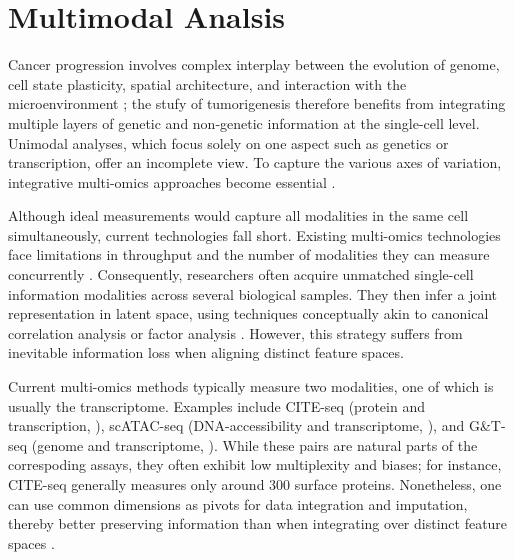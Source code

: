 \section{Multimodal Analsis}

\label{sec:modalities-multimodal-intro}

Cancer progression involves complex interplay between the evolution of genome, cell state plasticity, spatial architecture, and interaction with the microenvironment ; the stufy of tumorigenesis therefore benefits from integrating multiple layers of genetic and non-genetic information at the single-cell level. Unimodal analyses, which focus solely on one aspect such as genetics or transcription, offer an incomplete view. To capture the various axes of variation, integrative multi-omics approaches become essential \parencite{Nam2021-xt,Baysoy2023-qr}.

Although ideal measurements would capture all modalities in the same cell simultaneously, current technologies fall short. Existing multi-omics technologies face limitations in throughput and the number of modalities they can measure concurrently \parencite{Baysoy2023-qr}. Consequently, researchers often acquire unmatched single-cell information modalities across several biological samples. They then infer a joint representation in latent space, using techniques conceptually akin to canonical correlation analysis \parencite{Stuart2019-mi} or factor analysis \parencite{Argelaguet2018-oz,Velten2022-gc}. However, this strategy suffers from inevitable information loss when aligning distinct feature spaces.

Current multi-omics methods typically measure two modalities, one of which is usually the transcriptome. Examples include CITE-seq (protein and transcription, \textcite{Stoeckius2017-rz}), scATAC-seq (DNA-accessibility and transcriptome, \textcite{Lareau2019-xr}), and G\&T-seq (genome and transcriptome, \textcite{Macaulay2015-gh}). While these pairs are natural parts of the correspoding assays, they often exhibit low multiplexity and biases; for instance, CITE-seq generally measures only around 300 surface proteins. Nonetheless, one can use common dimensions as pivots for data integration and imputation, thereby better preserving information than when integrating over distinct feature spaces \parencite{Hao2021-qn, Ashuach2023-wq}.

